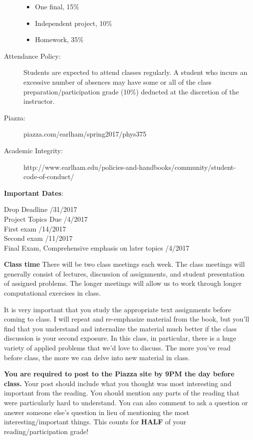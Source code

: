 \documentclass[12pt]{article}
\begin{document}
\begin{description}
\begin{itemize}
  \item One final, 15\%
  \item Independent project, 10\%
  \item Homework, 35\%
\end{itemize}\vspace{-.2in}
\item[Attendance Policy:] Students are expected to attend classes regularly. A student who incurs an excessive
number of absences may have some or all of the class preparation/participation grade (10\%) deducted at the discretion of the instructor.
\item[Piazza:] piazza.com/earlham/spring2017/phys375
\item[Academic Integrity:] {\small http://www.earlham.edu/policies-and-handbooks/community/student-code-of-conduct/}
\end{description}
\noindent\textbf{Important Dates}:
\begin{center} \begin{minipage}{5in}
\begin{flushleft}
Drop Deadline /31/2017\\
Project Topics Due /4/2017\\
First exam /14/2017\\ 
Second exam /11/2017\\ 
Final Exam, Comprehensive emphasis on later topics /4/2017\\
\end{flushleft}
\end{minipage}
\end{center}

\pagebreak
\noindent\textbf{Class time} There will be two class meetings
each week. The class meetings will generally consist of lectures,
discussion of assignments, and student presentation of assigned
problems. The longer meetings will allow us to work through longer
computational exercises in class.

It is very important that you study the appropriate text assignments
before coming to class. I will repeat and re-emphasize material from
the book, but you'll find that you understand and internalize the
material much better if the class discussion is your second
exposure. In this class, in particular, there is a huge variety of
applied problems that we'd love to discuss. The more you've read
before class, the more we can delve into new material in class.

\textbf{You are required to post to the Piazza site by 9PM the day
  before class.} Your post should include what you thought was most
interesting and important from the reading. You should mention any
parts of the reading that were particularly hard to understand. You
can also comment to ask a question or answer someone else's question
in lieu of mentioning the most interesting/important things.
This
counts for \textbf{HALF} of your reading/participation grade! 
\end{document}
